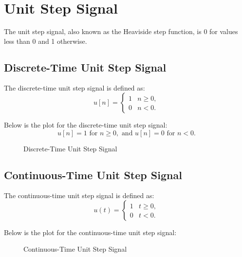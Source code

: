 \section{Unit Step Signal}
The unit step signal, also known as the Heaviside step function, is
0 for values less than 0 and 1 otherwise. 

\subsection{Discrete-Time Unit Step Signal}
The discrete-time unit step signal is defined as:
\[
u[n] =
\begin{cases}
1 & n \geq 0, \\
0 & n < 0.
\end{cases}
\]

Below is the plot for the discrete-time unit step signal:
\[
u[n] = 1 \text{ for } n \geq 0, \text{ and } u[n] = 0 \text{ for } n < 0.
\]

\begin{figure}[h!]
\centering
{}
\caption{Discrete-Time Unit Step Signal}
\end{figure}

\subsection{Continuous-Time Unit Step Signal}
The continuous-time unit step signal is defined as:
\[
u(t) =
\begin{cases}
1 & t \geq 0, \\
0 & t < 0.
\end{cases}
\]

Below is the plot for the continuous-time unit step signal:

\begin{figure}[h!]
\centering
{}
\caption{Continuous-Time Unit Step Signal}
\end{figure}

